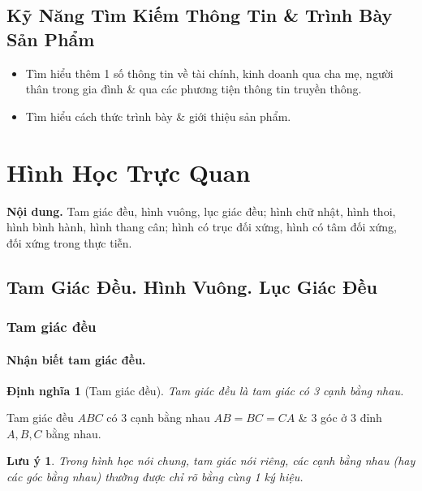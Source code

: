 \documentclass{article}
\numberwithin{equation}{section}
\newtheorem{definition}{Định nghĩa}[section]
\newtheorem{remark}{Lưu ý}[section]
\begin{document}
\subsection{Kỹ Năng Tìm Kiếm Thông Tin \& Trình Bày Sản Phẩm}

\begin{itemize}
	\item Tìm hiểu thêm 1 số thông tin về tài chính, kinh doanh qua cha mẹ, người thân trong gia đình \& qua các phương tiện thông tin truyền thông.
	\item Tìm hiểu cách thức trình bày \& giới thiệu sản phẩm.
\end{itemize}


\section{Hình Học Trực Quan}
\textbf{Nội dung.} Tam giác đều, hình vuông, lục giác đều; hình chữ nhật, hình thoi, hình bình hành, hình thang cân; hình có trục đối xứng, hình có tâm đối xứng, đối xứng trong thực tiễn.

\subsection{Tam Giác Đều. Hình Vuông. Lục Giác Đều}

\subsubsection{Tam giác đều}

\paragraph{Nhận biết tam giác đều.}
\begin{definition}[Tam giác đều]
	\emph{Tam giác đều} là tam giác có 3 cạnh bằng nhau.
\end{definition}
Tam giác đều $ABC$ có 3 cạnh bằng nhau $AB = BC = CA$ \& 3 góc ở 3 đỉnh $A,B,C$ bằng nhau.

\begin{remark}
	Trong hình học nói chung, tam giác nói riêng, các cạnh bằng nhau (hay các góc bằng nhau) thường được chỉ rõ bằng cùng 1 ký hiệu.
\end{remark}
\end{document}
